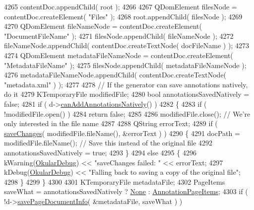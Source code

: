 \begin{DoxyCode}
4265     contentDoc.appendChild( root );
4266 
4267     QDomElement filesNode = contentDoc.createElement( \textcolor{stringliteral}{"Files"} );
4268     root.appendChild( filesNode );
4269 
4270     QDomElement fileNameNode = contentDoc.createElement( \textcolor{stringliteral}{"DocumentFileName"} );
4271     filesNode.appendChild( fileNameNode );
4272     fileNameNode.appendChild( contentDoc.createTextNode( docFileName ) );
4273 
4274     QDomElement metadataFileNameNode = contentDoc.createElement( \textcolor{stringliteral}{"MetadataFileName"} );
4275     filesNode.appendChild( metadataFileNameNode );
4276     metadataFileNameNode.appendChild( contentDoc.createTextNode( \textcolor{stringliteral}{"metadata.xml"} ) );
4277 
4278     \textcolor{comment}{// If the generator can save annotations natively, do it}
4279     KTemporaryFile modifiedFile;
4280     \textcolor{keywordtype}{bool} annotationsSavedNatively = \textcolor{keyword}{false};
4281     \textcolor{keywordflow}{if} ( d->\hyperlink{classOkular_1_1DocumentPrivate_ac0e0b9633df5fbd632e9ffa865b0f04b}{canAddAnnotationsNatively}() )
4282     \{
4283         \textcolor{keywordflow}{if} ( !modifiedFile.open() )
4284             \textcolor{keywordflow}{return} \textcolor{keyword}{false};
4285 
4286         modifiedFile.close(); \textcolor{comment}{// We're only interested in the file name}
4287 
4288         QString errorText;
4289         \textcolor{keywordflow}{if} ( \hyperlink{classOkular_1_1Document_ac3e0b31133ab8ef36bb95038c8f93380}{saveChanges}( modifiedFile.fileName(), &errorText ) )
4290         \{
4291             docPath = modifiedFile.fileName(); \textcolor{comment}{// Save this instead of the original file}
4292             annotationsSavedNatively = \textcolor{keyword}{true};
4293         \}
4294         \textcolor{keywordflow}{else}
4295         \{
4296             kWarning(\hyperlink{debug__p_8h_af16c6e32a95969dd0605d792ec9807c7}{OkularDebug}) << \textcolor{stringliteral}{"saveChanges failed: "} << errorText;
4297             kDebug(\hyperlink{debug__p_8h_af16c6e32a95969dd0605d792ec9807c7}{OkularDebug}) << \textcolor{stringliteral}{"Falling back to saving a copy of the original file"};
4298         \}
4299     \}
4300 
4301     KTemporaryFile metadataFile;
4302     PageItems saveWhat = annotationsSavedNatively ? \hyperlink{namespaceOkular_ad8955fd515cc3f63a14cdff6723e6c1ba6969c0e2e87cc779dae8be495740eda6}{None} : 
      \hyperlink{namespaceOkular_ad8955fd515cc3f63a14cdff6723e6c1bae381057ad4a79c350a0d4a9aaaaa995b}{AnnotationPageItems};
4303     \textcolor{keywordflow}{if} ( !d->\hyperlink{classOkular_1_1DocumentPrivate_a7d06a43560a005a4a4a98ab1dafda83f}{savePageDocumentInfo}( &metadataFile, saveWhat ) )

\end{DoxyCode}

